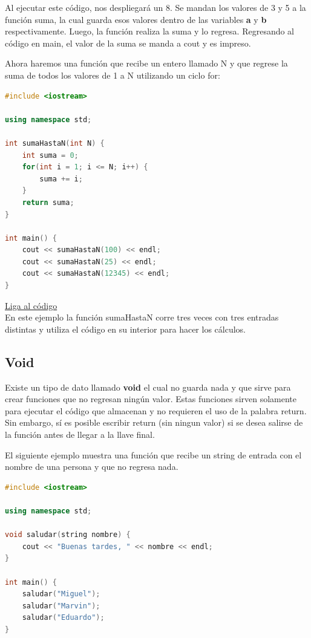 \documentclass{article}
\begin{document}
Al ejecutar este código, nos despliegará un 8. Se mandan los valores de 3 y 5 a la función suma, la cual guarda esos valores dentro de las variables \textbf{a} y \textbf{b} respectivamente. Luego, la función realiza la suma y lo regresa. Regresando al código en main, el valor de la suma se manda a cout y es impreso.

Ahora haremos una función que recibe un entero llamado N y que regrese la suma de todos los valores de 1 a N utilizando un ciclo for:

\begin{lstlisting}[language=C++, title=Función de suma gaussiana]
#include <iostream>

using namespace std;

int sumaHastaN(int N) {
	int suma = 0;
	for(int i = 1; i <= N; i++) {
		suma += i;
	}
	return suma;
}

int main() {
	cout << sumaHastaN(100) << endl;
	cout << sumaHastaN(25) << endl;
	cout << sumaHastaN(12345) << endl;
}
\end{lstlisting}
\href{https://repl.it/@Jamesscn/Funciones}{Liga al código} \\

En este ejemplo la función sumaHastaN corre tres veces con tres entradas distintas y utiliza el código en su interior para hacer los cálculos.

\subsection{Void}

Existe un tipo de dato llamado \textbf{void} el cual no guarda nada y que sirve para crear funciones que no regresan ningún valor. Estas funciones sirven solamente para ejecutar el código que almacenan y no requieren el uso de la palabra return. Sin embargo, sí es posible escribir return (sin ningun valor) si se desea salirse de la función antes de llegar a la llave final.

El siguiente ejemplo muestra una función que recibe un string de entrada con el nombre de una persona y que no regresa nada.

\begin{lstlisting}[language=C++, title=Saludo]
#include <iostream>

using namespace std;

void saludar(string nombre) {
	cout << "Buenas tardes, " << nombre << endl;
}

int main() {
	saludar("Miguel");
	saludar("Marvin");
	saludar("Eduardo");
}
\end{lstlisting}
\end{document}

